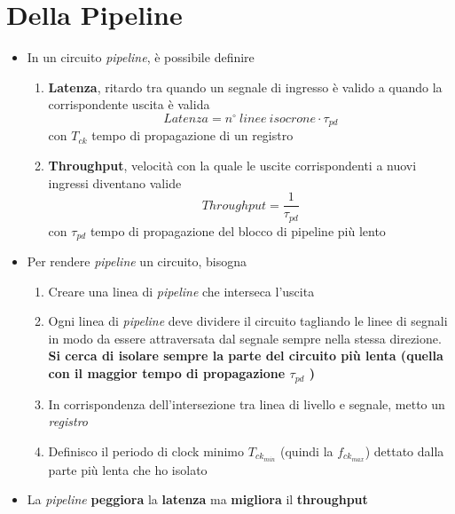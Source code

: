 \documentclass{article}
\begin{document}
\section{Della Pipeline}
\begin{itemize}
	\item In un circuito \textit{pipeline}, è possibile definire
	\begin{enumerate}
		\item \textbf{Latenza}, ritardo tra quando un segnale di ingresso è valido a quando la corrispondente uscita è valida \[Latenza = n^{\circ}\:linee\:isocrone \cdot \tau_{pd} \] con \(T_{ck}\) tempo di propagazione di un registro
		\item \textbf{Throughput}, velocità con la quale le uscite corrispondenti a nuovi ingressi diventano valide \[Throughput = \frac{1}{\tau_{pd}}\] con \(\tau_{pd}\) tempo di propagazione del blocco di pipeline più lento
	\end{enumerate}
	\item Per rendere \textit{pipeline} un circuito, bisogna
	\begin{enumerate}
		\item Creare una linea di \textit{pipeline} che interseca l'uscita
		\item Ogni linea di \textit{pipeline} deve dividere il circuito tagliando le linee di segnali in modo da essere attraversata dal segnale sempre nella stessa direzione. \textbf{Si cerca di isolare sempre la parte del circuito più lenta (quella con il maggior tempo di propagazione \( \tau_{pd} \) )}
		\item In corrispondenza dell'intersezione tra linea di livello e segnale, metto un \textit{registro}
		\item Definisco il periodo di clock minimo \(T_{ck_{min}}\) (quindi la \(f_{ck_{max}}\)) dettato dalla parte più lenta che ho isolato
	\end{enumerate}
	\item La \textit{pipeline} \textbf{peggiora} la \textbf{latenza} ma \textbf{migliora} il \textbf{throughput}
\end{itemize}
\end{document}
